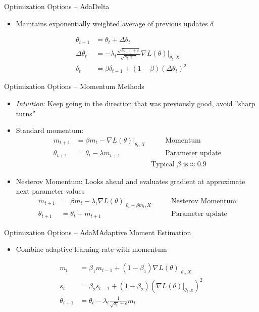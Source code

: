 \documentclass[ignorenonframetext,xcolor=x11names]{beamer}
\begin{document}
\begin{frame}{Optimization Options -- AdaDelta}
\begin{itemize}
  \item Maintains exponentially weighted average of previous updates $\delta$
\end{itemize}
\begin{align*}
\theta_{t+1} &= \theta_t + \Delta\theta_t \\
\Delta\theta_{t} &= - \lambda_t \frac{\sqrt{\delta_{t-1} + \epsilon}}{\sqrt{s_t + \epsilon}} \nabla L(\theta) \rvert_{\theta_t, X} \\
\delta_t &= \beta \delta_{t-1} + (1-\beta) (\Delta\theta_t)^2
\end{align*}
\end{frame}

\begin{frame}{Optimization Options -- Momentum Methods}
\begin{itemize}
  \item \emph{Intuition}: Keep going in the direction that was previously good, avoid ''sharp turns''
  \item Standard momentum:
\begin{align*}
m_{t+1} &= \beta m_{t} - \nabla L(\theta) \rvert_{\theta_t, X} &\qquad \text{Momentum} \\
\theta_{t+1} &= \theta_{t} - \lambda m_{t+1} &\qquad \text{Parameter update} \\
& &\text{Typical $\beta$ is} \approx 0.9
\end{align*}
  \item Nesterov Momentum: Looks ahead and evaluates gradient at approximate next parameter values
\begin{align*}
m_{t+1} &= \beta m_{t} - \lambda_t \nabla L(\theta) \rvert_{\theta_{t}+\beta m_{t}, X} &\qquad \text{Nesterov Momentum} \\
\theta_{t+1} &= \theta_{t} + m_{t+1} &\qquad \text{Parameter update}
\end{align*}
\end{itemize}
\end{frame}


\begin{frame}{Optimization Options -- AdaM}{Adaptive Moment Estimation}
\begin{itemize}
  \item Combine adaptive learning rate with momentum
\end{itemize}
\begin{align*}
m_t &= \beta_1 m_{t-1} + (1-\beta_1) \nabla L(\theta)\rvert_{\theta_t, X} \\
s_t &= \beta_2 s_{t-1} + (1-\beta_2) \left( \nabla L(\theta)\vert_{\theta_t, x} \right)^2 \\
\theta_{t+1} &= \theta_t - \lambda_t \frac{1}{\sqrt{s_t}+\epsilon} m_t 
\end{align*}
\end{frame}
\end{document}
